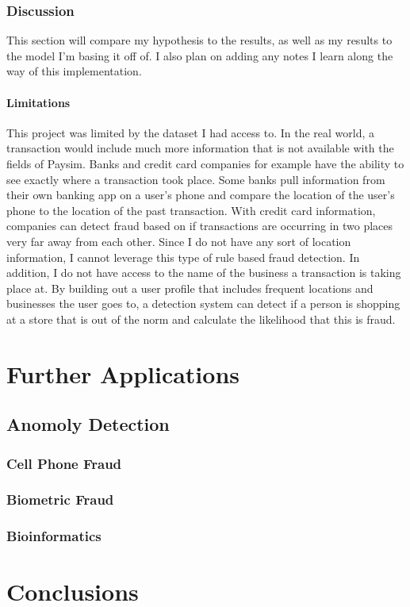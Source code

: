 \documentclass[midd]{thesis}
\begin{document}
\subsection{Discussion}

This section will compare my hypothesis to the results, as well as my results to the model I'm basing it off of. I also plan on adding any notes I learn along the way of this implementation.

\subsubsection{Limitations}


This project was limited by the dataset I had access to. In the real world, a transaction would include much more information that is not available with the fields of Paysim. Banks and credit card companies for example have the ability to see exactly where a transaction took place. Some banks pull information from their own banking app on a user's phone and compare the location of the user's phone to the location of the past transaction. With credit card information, companies can detect fraud based on if transactions are occurring in two places very far away from each other. Since I do not have any sort of location information, I cannot leverage this type of rule based fraud detection. In addition, I do not have access to the name of the business a transaction is taking place at. By building out a user profile that includes frequent locations and businesses the user goes to, a detection system can detect if a person is shopping at a store that is out of the norm and calculate the likelihood that this is fraud. 


\pagebreak
\chapter{Further Applications}
\label{sec:future}


\section{Anomoly Detection}

\subsection{Cell Phone Fraud}

\subsection{Biometric Fraud}

\subsection{Bioinformatics}

\pagebreak
\chapter{Conclusions}




\end{document}

